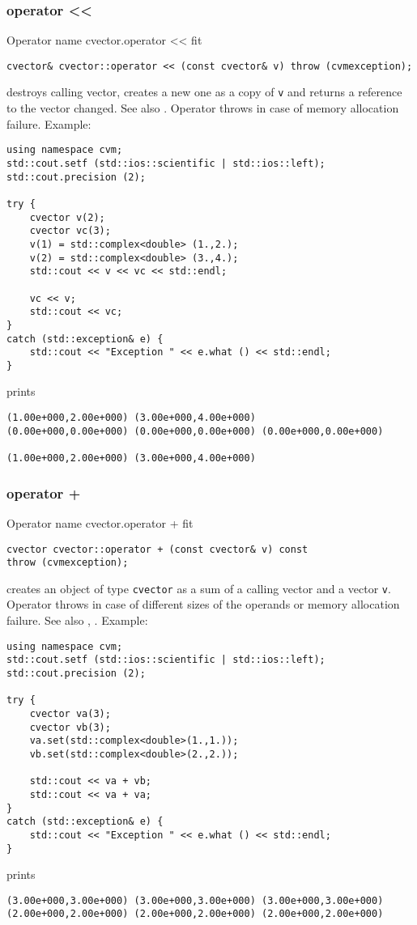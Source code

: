 \subsubsection{operator <{}<}
Operator%
\pdfdest name {cvector.operator <<} fit
\begin{verbatim}
cvector& cvector::operator << (const cvector& v) throw (cvmexception);
\end{verbatim}
destroys  calling vector, creates a new one as a copy of \verb"v"
and returns a reference to
the vector changed.
See also .
Operator throws  
in case of memory allocation failure.
Example:
\begin{Verbatim}
using namespace cvm;
std::cout.setf (std::ios::scientific | std::ios::left);
std::cout.precision (2);

try {
    cvector v(2);
    cvector vc(3);
    v(1) = std::complex<double> (1.,2.);
    v(2) = std::complex<double> (3.,4.);
    std::cout << v << vc << std::endl;

    vc << v;
    std::cout << vc;
}
catch (std::exception& e) {
    std::cout << "Exception " << e.what () << std::endl;
}
\end{Verbatim}
prints
\begin{Verbatim}
(1.00e+000,2.00e+000) (3.00e+000,4.00e+000)
(0.00e+000,0.00e+000) (0.00e+000,0.00e+000) (0.00e+000,0.00e+000)

(1.00e+000,2.00e+000) (3.00e+000,4.00e+000)
\end{Verbatim}
\newpage



\subsubsection{operator +}
Operator%
\pdfdest name {cvector.operator +} fit
\begin{verbatim}
cvector cvector::operator + (const cvector& v) const
throw (cvmexception);
\end{verbatim}
creates an object of type \verb"cvector" as a sum of
a calling  vector and a vector \verb"v".
Operator throws 
in case of different sizes of the operands
or memory allocation failure.
See also , .
Example:
\begin{Verbatim}
using namespace cvm;
std::cout.setf (std::ios::scientific | std::ios::left);
std::cout.precision (2);

try {
    cvector va(3);
    cvector vb(3);
    va.set(std::complex<double>(1.,1.));
    vb.set(std::complex<double>(2.,2.));

    std::cout << va + vb;
    std::cout << va + va;
}
catch (std::exception& e) {
    std::cout << "Exception " << e.what () << std::endl;
}
\end{Verbatim}
prints
\begin{Verbatim}
(3.00e+000,3.00e+000) (3.00e+000,3.00e+000) (3.00e+000,3.00e+000)
(2.00e+000,2.00e+000) (2.00e+000,2.00e+000) (2.00e+000,2.00e+000)
\end{Verbatim}
\newpage


